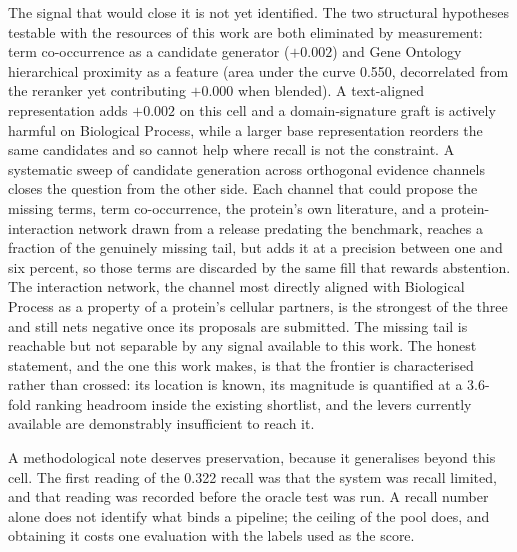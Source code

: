 The signal that would close it is not yet identified. The two structural
hypotheses testable with the resources of this work are both eliminated by
measurement: term co-occurrence as a candidate generator ($+0.002$) and Gene
Ontology hierarchical proximity as a feature (area under the curve 0.550,
decorrelated from the reranker yet contributing $+0.000$ when blended). A
text-aligned representation adds $+0.002$ on this cell and a domain-signature
graft is actively harmful on Biological Process, while a larger base
representation reorders the same candidates and so cannot help where recall is
not the constraint. A systematic sweep of candidate generation across orthogonal
evidence channels closes the question from the other side. Each channel that could
propose the missing terms, term co-occurrence, the protein's own literature, and a
protein-interaction network drawn from a release predating the benchmark, reaches a
fraction of the genuinely missing tail, but adds it at a precision between one and
six percent, so those terms are discarded by the same fill that rewards abstention.
The interaction network, the channel most directly aligned with Biological Process
as a property of a protein's cellular partners, is the strongest of the three and
still nets negative once its proposals are submitted. The missing tail is reachable
but not separable by any signal available to this work. The honest statement, and
the one this work makes, is that
the frontier is characterised rather than crossed: its location is known, its
magnitude is quantified at a 3.6-fold ranking headroom inside the existing
shortlist, and the levers currently available are demonstrably insufficient to
reach it.

A methodological note deserves preservation, because it generalises beyond this
cell. The first reading of the 0.322 recall was that the system was recall
limited, and that reading was recorded before the oracle test was run. A recall
number alone does not identify what binds a pipeline; the ceiling of the pool
does, and obtaining it costs one evaluation with the labels used as the score.

